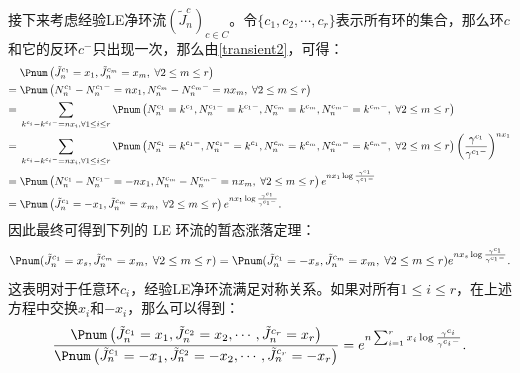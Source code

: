 接下来考虑经验LE净环流$(\tilde{J}^{c}_n)_{c\in C}$。令$\{c_1,c_2,\cdots,c_r\}$表示所有环的集合，那么环$c$和它的反环$c^-$只出现一次，那么由\ref{transient2}，可得：
\begin{align*}
    &\; \Pnum\left(\tilde{J}^{c_1}_n=x_1,\tilde{J}^{c_m}_n=x_m,\;\forall 2\le m \le r\right) \\
    =&\; \Pnum\left(N^{c_1}_n-N^{c_1-}_n=n x_1,N^{c_m}_n-N^{c_m-}_n=n x_m,\;\forall 2\le m \le r\right) \\
    =&\; \sum_{k^{c_i}-k^{c_i-}=n x_i,\forall 1\le i \le r} \Pnum\left(N^{c_1}_n=k^{c_1},N^{c_1-}_n=k^{c_1-},  N^{c_m}_n=k^{c_m},N^{c_m-}_n=k^{c_m-},\;\forall 2\le m \le r\right) \\
    =&\; \sum_{k^{c_i}-k^{c_i-}=n x_i,\forall 1\le i \le r} \Pnum\left(N^{c_1}_n=k^{c_1-},N^{c_1-}_n=k^{c_1}, N^{c_m}_n=k^{c_m},N^{c_m-}_n=k^{c_m-},\;\forall 2\le m \le r\right)\left(\frac{\gamma^{c_1}}{\gamma^{c_1-}}\right)^{n x_1}  \\
    =&\; \Pnum\left(N^{c_1}_n-N^{c_1-}_n=-n x_1, N^{c_m}_n-N^{c_m-}_n=n x_m,\;\forall 2\le m \le r\right) e^{n x_1 \log \frac{\gamma^{c_1}}{\gamma^{c_1-}}} \\
    =&\; \Pnum\left(\tilde{J}^{c_1}_n=-x_1,\tilde{J}^{c_m}_n=x_m,\;\forall 2\le m \le r\right) e^{n x_1 \log \frac{\gamma^{c_1}}{\gamma^{c_1-}}} .
\end{align*}
因此最终可得到下列的 LE 环流的暂态涨落定理：
\begin{equation}\label{strong}
    \Pnum(\tilde{J}^{c_1}_n=x_s,\tilde{J}^{c_m}_n=x_m,\;\forall 2\le m \le r) \\
    = \Pnum(\tilde{J}^{c_1}_n=-x_s,\tilde{J}^{c_m}_n=x_m,\;\forall 2\le m \le r)e^{nx_s\log\frac{\gamma^{c_1}}{\gamma^{c_1-}}}.
\end{equation}
这表明对于任意环$c_i$，经验LE净环流满足对称关系。如果对所有$1\le i \le r$，在上述方程中交换$x_i$和$-x_i$，那么可以得到：
\begin{equation}\label{weak}
    \begin{split}
    \frac{\Pnum\left(\tilde{J}^{c_1}_n=x_1,\tilde{J}^{c_2}_n=x_2,\cdots,\tilde{J}^{c_{r}}_n=x_{r}\right)}
    {\Pnum\left(\tilde{J}^{c_1}_n=-x_1,\tilde{J}^{c_2}_n=-x_2,\cdots,\tilde{J}^{c_{r}}_n=-x_{r}\right)}
    =e^{n\sum_{i=1}^{r}x_i\log\frac{\gamma^{c_i}}{\gamma^{c_i-}}}.
    \end{split}
\end{equation}


